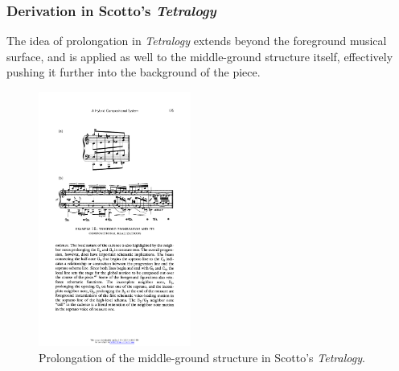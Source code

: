\begin{frame}
	\frametitle{Derivation in Scotto's \emph{Tetralogy}}
	The idea of prolongation in \emph{Tetralogy} extends beyond the foreground musical surface, and is applied as well to the middle-ground structure itself, effectively pushing it further into the background of the piece. 
	\begin{figure}
    	\centering
    	\includegraphics[width=5cm]{figures/scotto-schenker2.pdf}
    	\caption{Prolongation of the middle-ground structure in Scotto's \emph{Tetralogy}.}
	\end{figure}
\end{frame}


